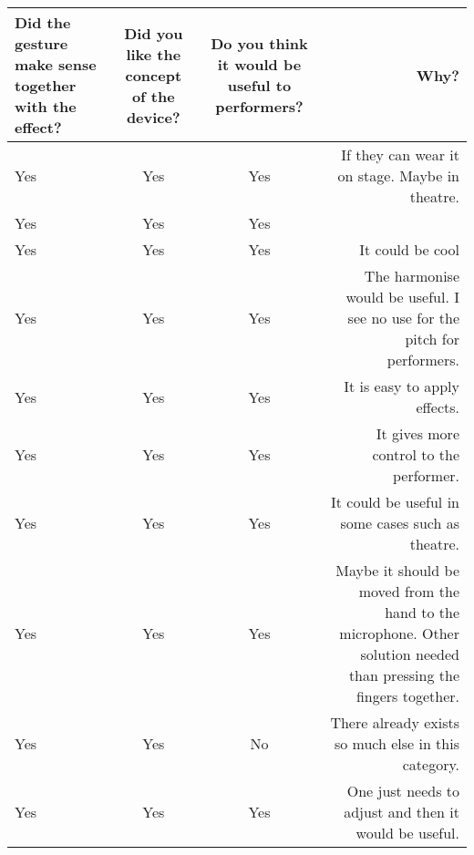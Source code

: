 \begin{tabular}{| l | c | c | r |}
\hline
Did the gesture make sense together with the effect? & Did you like the concept of the device? & Do you think it would be useful to performers? & Why? \\ \hline
Yes & Yes & Yes & If they can wear it on stage. Maybe in theatre. \\ \hline
Yes & Yes & Yes &  \\ \hline
Yes & Yes & Yes & It could be cool \\ \hline
Yes & Yes & Yes & The harmonise would be useful. I see no use for the pitch for performers. \\ \hline
Yes & Yes & Yes & It is easy to apply effects. \\ \hline
Yes & Yes & Yes & It gives more control to the performer. \\ \hline
Yes & Yes & Yes & It could be useful in some cases such as theatre. \\ \hline
Yes & Yes & Yes & Maybe it should be moved from the hand to the microphone. Other solution needed than pressing the fingers together. \\ \hline
Yes & Yes & No & There already exists so much else in this category. \\ \hline
Yes & Yes & Yes & One just needs to adjust and then it would be useful. \\ \hline
\end{tabular}